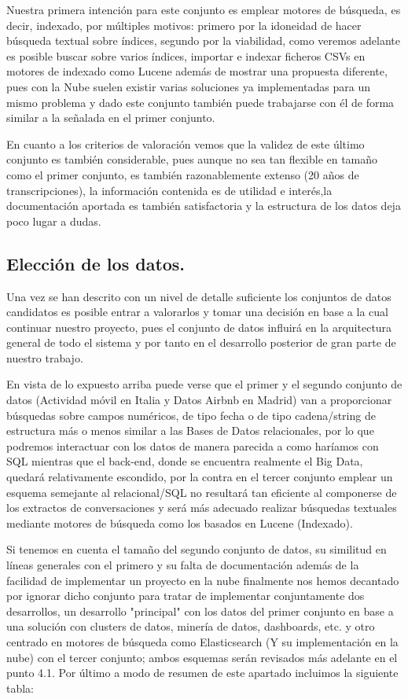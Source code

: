 \documentclass[11pt, a4paper]{article} %
\begin{document}
Nuestra primera intención para este conjunto es emplear motores de búsqueda, es decir, indexado, por múltiples motivos: primero por la idoneidad de hacer búsqueda textual sobre índices, segundo por la viabilidad, como veremos adelante es posible buscar sobre varios índices, importar e indexar ficheros CSVs en motores de indexado como Lucene además de mostrar una propuesta diferente, pues con la Nube suelen existir varias soluciones ya implementadas para un mismo problema y dado este conjunto también puede trabajarse con él de forma similar a la señalada en el primer conjunto.


En cuanto a los criterios de valoración vemos que la validez de este último conjunto es también considerable, pues aunque no sea tan flexible en tamaño como el primer conjunto, es también razonablemente extenso (20 años de transcripciones), la información contenida es de utilidad e interés,la documentación aportada es también satisfactoria y la estructura de los datos deja poco lugar a dudas.
\subsection{Elección de los datos.}
Una vez se han descrito con un nivel de detalle suficiente los conjuntos de datos candidatos es posible entrar a valorarlos y tomar una decisión en base a la cual continuar nuestro proyecto, pues el conjunto de datos influirá en la arquitectura general de todo el sistema y por tanto en el desarrollo posterior de gran parte de nuestro trabajo.

En vista de lo expuesto arriba puede verse que el primer y el segundo conjunto de datos (Actividad móvil en Italia y Datos Airbnb en Madrid) van a proporcionar búsquedas sobre campos numéricos, de tipo fecha o de tipo cadena/string de estructura más o menos similar a las Bases de Datos relacionales, por lo que podremos interactuar con los datos de manera parecida a como haríamos con SQL mientras que el back-end, donde se encuentra realmente el Big Data, quedará relativamente escondido, por la contra en el tercer conjunto emplear un esquema semejante al relacional/SQL no resultará tan eficiente al componerse de los extractos de conversaciones y será más adecuado realizar búsquedas textuales mediante motores de búsqueda como los basados en Lucene (Indexado).


Si tenemos en cuenta el tamaño del segundo conjunto de datos, su similitud en líneas generales con el primero y su falta de documentación además de la facilidad de implementar un proyecto en la nube finalmente nos hemos decantado por ignorar dicho conjunto para tratar de implementar conjuntamente dos desarrollos, un desarrollo "principal" con los datos del primer conjunto en base a una solución con clusters de datos, minería de datos, dashboards, etc.  y otro centrado en motores de búsqueda como Elasticsearch (Y su implementación en la nube) con el tercer conjunto; ambos esquemas serán revisados más adelante en el punto 4.1. Por último a modo de resumen de este apartado incluimos la siguiente tabla:
\end{document}
